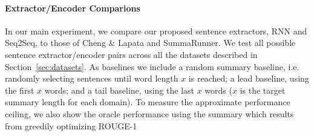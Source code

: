 \paragraph{Extractor/Encoder Comparions}{
In our main experiment, we compare our proposed 
sentence extractors, RNN and Seq2Seq,
to those of Cheng \& Lapata and SummaRunner.
We test all possible sentence extractor/encoder pairs across all the datasets
described in Section~\ref{sec:datasets}.} 
As baselines we include a random summary baseline, i.e. randomly selecting sentences until word length $x$ is reached; a lead baseline, using 
the first $x$ words;  and a tail baseline, using the last $x$ words
($x$ is the target summary length for each domain).
To measure the approximate performance ceiling,
we also show the oracle performance using the 
summary which results from greedily optimizing ROUGE-1 






